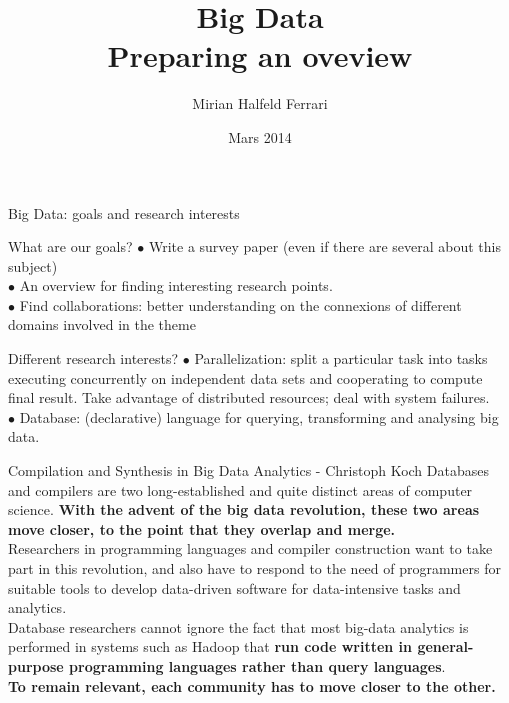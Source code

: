 \documentclass{beamer}
\title[Big Data]{Big Data\\
Preparing an oveview \\
}
\author[Mirian Halfeld Ferrari]{Mirian Halfeld Ferrari}
\institute[LIFO]{LIFO}
\date{Mars 2014}
\begin{document}
%
\begin{frame}
  \titlepage
 \end{frame}

\begin{frame}{Big Data: goals and research interests}

\begin{block}{What are our goals?}
$\bullet$ Write a survey paper (even if there are several about this subject)\\
$\bullet$ An overview for finding interesting research points.\\
$\bullet$ Find collaborations: better understanding on the connexions of different domains involved in the theme\\ 
\end{block}

\begin{block}{Different research interests?}
$\bullet$ Parallelization: split a  particular task into  tasks executing concurrently on independent data sets and cooperating to compute final result.
Take advantage of  distributed resources; deal with system failures.\\
$\bullet$ Database: (declarative) language for querying, transforming and analysing big data.



\end{block}

\end{frame}
\begin{frame}

\small
\begin{block}{Compilation and Synthesis in Big Data Analytics - Christoph Koch}
Databases and compilers are two long-established and quite distinct areas of computer science. \textbf{With the advent of the big data revolution, these two areas move closer, to the point that they overlap and merge.} \\

Researchers in programming languages and compiler construction want to take part in this revolution, and also have to respond to the need of programmers for suitable tools to develop data-driven software for data-intensive tasks and analytics. \\

Database researchers cannot ignore the fact that most big-data analytics is performed in systems such as Hadoop that \textbf{run code written in general-purpose programming languages rather than query languages}. \\

\textbf{To remain relevant, each community has to move closer to the other.} 
\end{block}
\end{frame}
\end{document}
